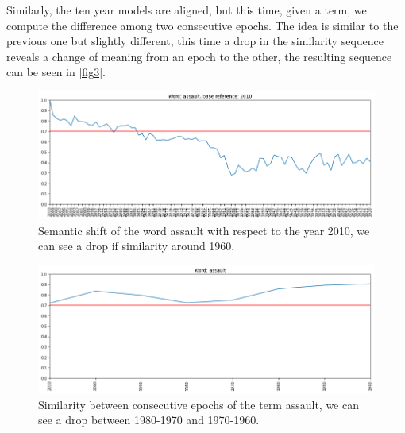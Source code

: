 Similarly, the ten year models are aligned, but this time, given a term, we compute the 
difference among two consecutive epochs. The idea is similar to the previous one but slightly 
different, this time a drop in the similarity sequence 
reveals a change of meaning from an epoch to the other, the resulting 
sequence can be seen in \vref{fig3}.

\begin{figure}
\includegraphics[width=\textwidth]{images/semantic_1.png}
\caption{Semantic shift of the word assault 
with respect to the year 2010, we can see a drop if similarity around 1960.} \label{fig2}
\end{figure}
\begin{figure}
\includegraphics[width=\textwidth]{images/semantic_2.png}
\caption{Similarity between consecutive epochs of the term assault, we can see a 
drop between 1980-1970 and 1970-1960.} \label{fig3}
\end{figure}

